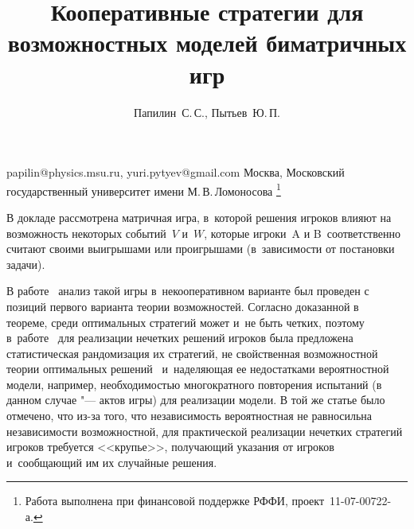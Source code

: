 \documentclass[twoside]{article}
\begin{document}
\title
    {Кооперативные стратегии для возможностных моделей биматричных игр}
\author
    {Папилин~С.\,С., Пытьев~Ю.\,П.}
\email
    {papilin@physics.msu.ru, yuri.pytyev@gmail.com}
\organization
    {Москва, Московский государственный университет имени М.\,В.\,Ломоносова}
\thanks{Работа выполнена при финансовой поддержке РФФИ, проект \No\,11-07-00722-а.}

\maketitle

В докладе рассмотрена матричная игра, в~которой решения игроков
влияют на возможность некоторых событий~$V$ и~$W$, которые игроки~A
и B~соответственно считают своими выигрышами или проигрышами
(в~зависимости от постановки задачи).

В работе~\cite{article} анализ такой игры в~некооперативном варианте был проведен с позиций первого
варианта теории возможностей. Согласно доказанной в~\cite{article} теореме, среди оптимальных
стратегий может и~не быть четких, поэтому в~работе~\cite{article} для реализации нечетких решений
игроков была предложена статистическая рандомизация их стратегий, не свойственная возможностной
теории оптимальных решений~\cite{book} и~наделяющая ее недостатками вероятностной модели, например,
необходимостью многократного повторения испытаний (в данном случае "--- актов игры) для реализации
модели. В той же статье было отмечено, что из-за того, что независимость вероятностная не
равносильна независимости возможностной, для практической реализации нечетких стратегий игроков
требуется <<крупье>>, получающий указания от игроков и~сообщающий им их случайные решения.
\end{document}
